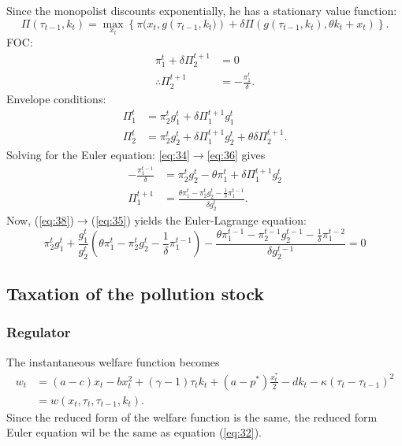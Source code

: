 \documentclass{amsart}
\begin{document}
Since the monopolist discounts exponentially, he has a stationary
value function:
\begin{equation}
  \label{eq:33}
  \Pi(\tau_{t-1},k_t) = \max_{x_t} \left\{
    \pi(x_t,g\left(\tau_{t-1},k_t)\right) + \delta \Pi \left(
      g(\tau_{t-1},k_t), \theta k_t + x_t \right) \right\}.
\end{equation}
FOC:
\begin{align}
  \pi^t_1 + \delta \Pi^{t+1}_2 &= 0 \\  \label{eq:34}
  \therefore \Pi^{t+1}_2 &= -\frac{\pi^t_1}\delta.
\end{align}
Envelope conditions:
\begin{align}
  \label{eq:35}
  \Pi^t_1 &= \pi^t_2g^t_1 + \delta \Pi^{t+1}_1g^t_1 \\\label{eq:36}
  \Pi^t_2 &= \pi^t_2g^t_2 + \delta \Pi^{t+1}_1g^t_2 + \theta\delta\Pi^{t+1}_2.
\end{align}
Solving for the Euler equation:
\eqref{eq:34}$\to$\eqref{eq:36} gives
\begin{align}
  \label{eq:37}
  -\frac{\pi^{t-1}_1}\delta &= \pi^t_2g^t_2 - \theta\pi^t_1 + \delta
  \Pi^{t+1}_1g^t_2 \\\label{eq:38}
  \Pi^{t+1}_1 &= \frac{\theta\pi^t_1 - \pi^t_2g^t_2 -
    \frac{1}\delta\pi^{t-1}_1}{\delta g^t_2}.
\end{align}
Now, (\ref{eq:38})$\rightarrow$(\ref{eq:35}) yields the Euler-Lagrange
equation:
\begin{equation}
  \label{eq:39}
  \pi^t_2g^t_1 + \frac{g^t_1}{g^t_2} \left( \theta \pi^t_1 -
    \pi^t_2g^t_2 - \frac{1}\delta\pi^{t-1}_1 \right) -
  \frac{\theta\pi^{t-1}_1 - \pi^{t-1}_2g^{t-1}_2 -
    \frac{1}\delta\pi^{t-2}_1}{\delta g^{t-1}_2} = 0
\end{equation}


\subsection{Taxation of the pollution stock}
\label{sec:taxat-pollut-stock}

\subsubsection{Regulator}
\label{sec:regulator-2}

The instantaneous welfare function becomes
\begin{align}
  \label{eq:47}
  w_t &= (a-c)x_t - bx_t^2 + (\gamma -1)\tau_tk_t +
  (a-p^*)\frac{x_t^*}{2} - dk_t - \kappa (\tau_t-\tau_{t-1})^2 \\ &=
  w(x_t,\tau_t,\tau_{t-1},k_t).
\end{align}
Since the reduced form of the welfare function is the same, the
reduced form Euler equation wil be the same as equation (\ref{eq:32}).
\end{document}
